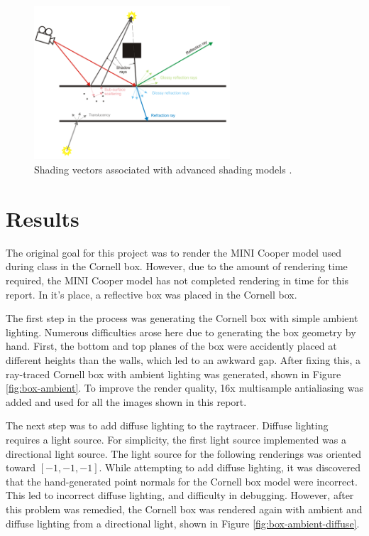 \documentclass[letterpaper, 11pt, onecolumn, oneside]{article}
\begin{document}
        \begin{figure}[ht]
            \includegraphics[width=0.65\textwidth]{ray-tracing-shading-model.png}
            \centering
            \caption{Shading vectors associated with advanced shading models \cite{chaosShading}.}
            \label{fig:adv-shading-model-vectors}
        \end{figure}


\section{Results}
    The original goal for this project was to render the MINI Cooper model used during class in the Cornell box.
    However, due to the amount of rendering time required, the MINI Cooper model has not completed rendering in time for this report.
    In it's place, a reflective box was placed in the Cornell box.

    The first step in the process was generating the Cornell box with simple ambient lighting.
    Numerous difficulties arose here due to generating the box geometry by hand.
    First, the bottom and top planes of the box were accidently placed at different heights than the walls, which led to an awkward gap.
    After fixing this, a ray-traced Cornell box with ambient lighting was generated, shown in Figure \ref{fig:box-ambient}.
    To improve the render quality, 16x multisample antialiasing was added and used for all the images shown in this report.

    The next step was to add diffuse lighting to the raytracer.
    Diffuse lighting requires a light source.
    For simplicity, the first light source implemented was a directional light source.
    The light source for the following renderings was oriented toward $[-1, -1, -1]$.
    While attempting to add diffuse lighting, it was discovered that the hand-generated point normals for the Cornell box model were incorrect.
    This led to incorrect diffuse lighting, and difficulty in debugging.
    However, after this problem was remedied, the Cornell box was rendered again with ambient and diffuse lighting from a directional light, shown in Figure \ref{fig:box-ambient-diffuse}.
\end{document}
